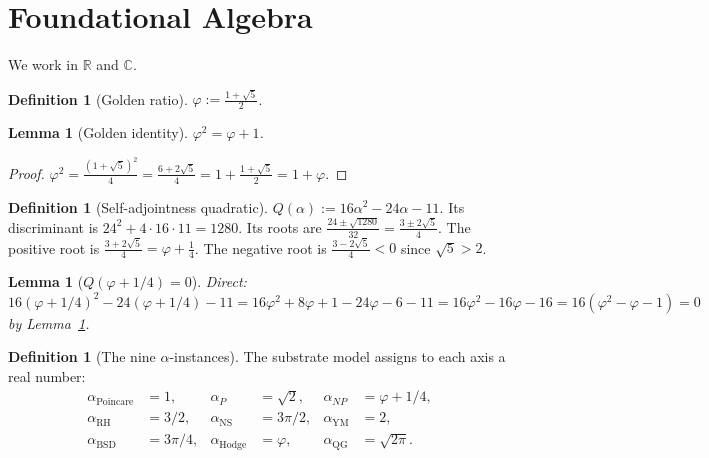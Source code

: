 \documentclass[11pt,a4paper]{article}
\theoremstyle{plain}
\newtheorem{lemma}[theorem]{Lemma}
\theoremstyle{definition}
\newtheorem{definition}[theorem]{Definition}
\theoremstyle{remark}
\newcommand{\aPo}{\alpha_{\mathrm{Poincare}}}
\newcommand{\aP}{\alpha_{P}}
\newcommand{\aNP}{\alpha_{NP}}
\newcommand{\aRH}{\alpha_{\mathrm{RH}}}
\newcommand{\aYM}{\alpha_{\mathrm{YM}}}
\newcommand{\aNS}{\alpha_{\mathrm{NS}}}
\newcommand{\aBSD}{\alpha_{\mathrm{BSD}}}
\newcommand{\aHodge}{\alpha_{\mathrm{Hodge}}}
\newcommand{\aQG}{\alpha_{\mathrm{QG}}}
\begin{document}
\section{Foundational Algebra}
\label{sec:foundations}

We work in $\mathbb{R}$ and $\mathbb{C}$.

\begin{definition}[Golden ratio]
\label{def:golden}
$\varphi := \frac{1 + \sqrt{5}}{2}$.
\end{definition}

\begin{lemma}[Golden identity]
\label{lem:golden}
$\varphi^{2} = \varphi + 1$.
\end{lemma}
\begin{proof}
$\varphi^{2} = \tfrac{(1+\sqrt{5})^{2}}{4} = \tfrac{6 + 2\sqrt{5}}{4} = 1 + \tfrac{1 + \sqrt{5}}{2} = 1 + \varphi$.
\end{proof}

\begin{definition}[Self-adjointness quadratic]
\label{def:saq}
$Q(\alpha) := 16\alpha^{2} - 24\alpha - 11$. Its discriminant
is $24^{2} + 4 \cdot 16 \cdot 11 = 1280$. Its roots are
$\tfrac{24 \pm \sqrt{1280}}{32} = \tfrac{3 \pm 2\sqrt{5}}{4}$.
The positive root is $\tfrac{3 + 2\sqrt{5}}{4} = \varphi + \tfrac{1}{4}$.
The negative root is $\tfrac{3 - 2\sqrt{5}}{4} < 0$ since $\sqrt{5} > 2$.
\end{definition}

\begin{lemma}[$Q(\varphi + 1/4) = 0$]
\label{lem:np}
Direct: $16(\varphi + 1/4)^{2} - 24(\varphi + 1/4) - 11
= 16\varphi^{2} + 8\varphi + 1 - 24\varphi - 6 - 11
= 16\varphi^{2} - 16\varphi - 16 = 16(\varphi^{2} - \varphi - 1) = 0$
by Lemma~\ref{lem:golden}.
\end{lemma}

\begin{definition}[The nine $\alpha$-instances]
\label{def:nine-alphas}
The substrate model assigns to each axis a real number:
\begin{align*}
\aPo  &= 1, &
\aP   &= \sqrt{2}, &
\aNP  &= \varphi + 1/4,\\
\aRH  &= 3/2, &
\aNS  &= 3\pi/2, &
\aYM  &= 2,\\
\aBSD &= 3\pi/4, &
\aHodge &= \varphi, &
\aQG  &= \sqrt{2\pi}.
\end{align*}
\end{definition}
\end{document}
